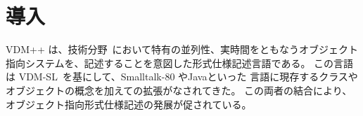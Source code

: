 \documentclass[\pformat,12pt]{jarticle}
\newcommand{\vdmsl}{VDM-SL}
\newcommand{\vdmpp}{VDM++}
\begin{document}




\newcommand{\Lit}[1]{`{\tt #1}\Quote}
\newcommand{\Rule}[2]{
  \begin{quote}\begin{tabbing}
    #1\index{#1}\ \ \= = \ \ \= #2  ; %
    
  \end{tabbing}\end{quote}
  }
\newcommand{\SeqPt}[1]{\{\ #1\ \}}
\newcommand{\lfeed}{\\ \> \>}
\newcommand{\dsepl}{\ $|$\ }
\newcommand{\dsep}{\\ \> $|$ \>}
\newcommand{\Lop}[1]{`{\sf #1}\Quote}
\newcommand{\blankline}{\vspace{\baselineskip}}
\newcommand{\Brack}[1]{(\ #1\ )}
\newcommand{\nmk}{\footnotemark}
\newcommand{\ntext}[1]{\footnotetext{{\bf Note: } #1}}
\newlength{\kwlen}
\newcommand{\Keyw}[1]{\settowidth{\kwlen}{\tt #1}\makebox[\kwlen][l]{\sf
    #1}}
\newcommand{\keyw}[1]{{\sf #1}}
\newcommand{\id}[1]{{\tt #1}}
\newcommand{\metaiv}[1]{\begin{alltt}\end{alltt}}

\newcommand{\OptPt}[1]{[\ #1\ ]}
\newcommand{\MAP}[2]{\kw{map }#1\kw{ to }#2}
\newcommand{\INMAP}[2]{\kw{inmap }#1\kw{ to }#2}
\newcommand{\SEQ}[1]{\kw{seq of }#1}
\newcommand{\NSEQ}[1]{\kw{seq1 of }#1}
\newcommand{\SET}[1]{\kw{set of }#1}
\newcommand{\PROD}[2]{#1 * #2}
\newcommand{\TO}[2]{$#1 \To #2$}
\newcommand{\FUN}[2]{#1 \To #2}
\newcommand{\PUBLIC}{\ifthenelse{\boolean{VDMpp}}{public\mbox{}}{\mbox{}}}
\newcommand{\PRIVATE}{\ifthenelse{\boolean{VDMpp}}{private}{\mbox{}}}
\newcommand{\PROTECTED}{\ifthenelse{\boolean{VDMpp}}{protected}{\mbox{}}}




\section{導入}


{\vdmpp} は、技術分野~\cite{Fitzgerald&98}において特有の並列性、実時間をともなうオブジェクト指向システムを、記述することを意図した形式仕様記述言語である。
この言語は \vdmsl~\cite{ISOVDM96}を基にして、Smalltalk-80 やJavaといった
言語に現存するクラスやオブジェクトの概念を加えての拡張がなされてきた。
この両者の結合により、オブジェクト指向形式仕様記述の発展が促されている。
\end{document}
